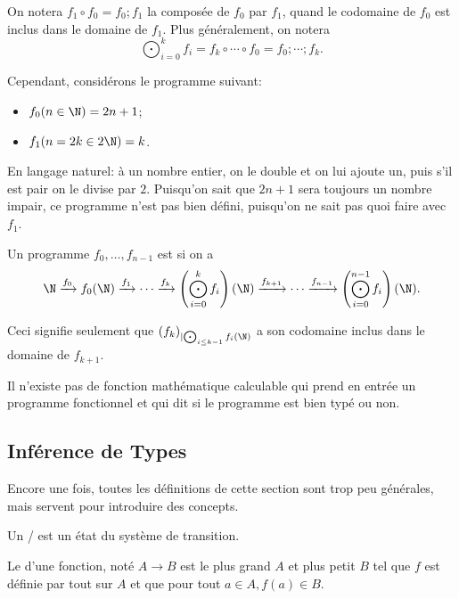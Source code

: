 \documentclass[info, math]{mpb-cours}
\begin{document}
\begin{definition}
	On notera $f_{1} \circ f_{0} = f_{0}; f_{1}$ la composée de $f_{0}$ par $f_{1}$,
	quand le codomaine de $f_{0}$ est inclus dans le domaine de $f_{1}$.
	Plus généralement, on notera
	\begin{equation*}
		\bigodot_{i = 0}^{k} f_{i} = f_{k}\circ \cdots \circ f_{0} = f_{0}; \cdots; f_{k}.
	\end{equation*}
\end{definition}

Cependant, considérons le programme suivant:
\begin{itemize}
	\item $f_{0}(n \in \N) = 2n + 1$;
	\item $f_{1}(n = 2k \in 2\N) = k$.
\end{itemize}
En langage naturel: à un nombre entier, on le double et on lui ajoute un, puis s'il est pair on le divise
par $2$.
Puisqu'on sait que $2n + 1$ sera toujours un nombre impair, ce programme n'est pas bien défini, puisqu'on
ne sait pas quoi faire avec $f_{1}$.

\begin{definition}
	Un programme $f_{0}, \ldots, f_{n - 1}$ est  si on a
	\begin{equation*}
		\N \xrightarrow{f_{0}} f_{0}(\N)
		\xrightarrow{f_{1}} \cdots
		\xrightarrow{f_{k}} \left(\bigodot_{i = 0}^{k}f_{i}\right)(\N)
		\xrightarrow{f_{k + 1}} \cdots \xrightarrow{f_{n - 1}} \left(\bigodot_{i = 0}^{n - 1}f_{i}\right)(\N).
	\end{equation*}
\end{definition}

Ceci signifie seulement que $(f_{k})_{\mid \bigodot_{i\leq k - 1}f_{i}(\N)}$ a son codomaine inclus dans le
domaine de $f_{k + 1}$.

\begin{thm}
	Il n'existe pas de fonction mathématique calculable qui prend en entrée un programme fonctionnel et qui
	dit si le programme est bien typé ou non.
\end{thm}

\subsection{Inférence de Types}
Encore une fois, toutes les définitions de cette section sont trop peu générales, mais servent pour
introduire des concepts.
\begin{definition}
	Un / est un état du système de transition.

	\smallskip

	Le  d'une fonction, noté $A \to B$ est le plus grand $A$ et plus petit $B$ tel que $f$ est
	définie par tout sur $A$ et que pour tout $a \in A, f(a) \in B$.
\end{definition}
\end{document}
